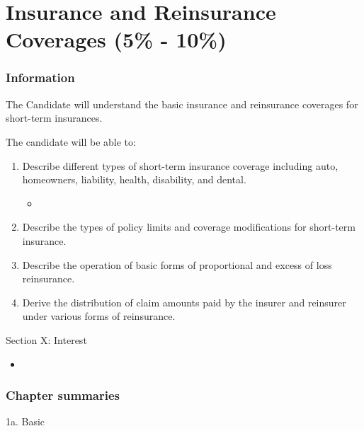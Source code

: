 \chapter[Insurance and Reinsurance Coverages]{Insurance and Reinsurance Coverages (5\% - 10\%)}

\subsection{Information}

\begin{distributions}[Objective]
The Candidate will understand the basic insurance and reinsurance coverages for short-term insurances.
\end{distributions}

\begin{outcomes}
The candidate will be able to:
\begin{enumerate}[label = \alph*), leftmargin = *]
	\item	Describe different types of short-term insurance coverage including auto, homeowners, liability, health, disability, and dental.
		\begin{itemize}[leftmargin = *]
		\item	
		\end{itemize}
	\item	Describe the types of policy limits and coverage modifications for short-term insurance.
	\item	Describe the operation of basic forms of proportional and excess of loss reinsurance.
	\item	Derive the distribution of claim amounts paid by the insurer and reinsurer under various forms of reinsurance.
\end{enumerate}
\end{outcomes}

\begin{ASM_chapter}
Section X: Interest 
\begin{itemize}[leftmargin = *]
	\item	{}
\end{itemize}
\end{ASM_chapter}

\subsection{Chapter summaries}

\begin{CHPT_SUMM_AUTO}[label = {L.-1a}]{1a. Basic}

\end{CHPT_SUMM_AUTO}
